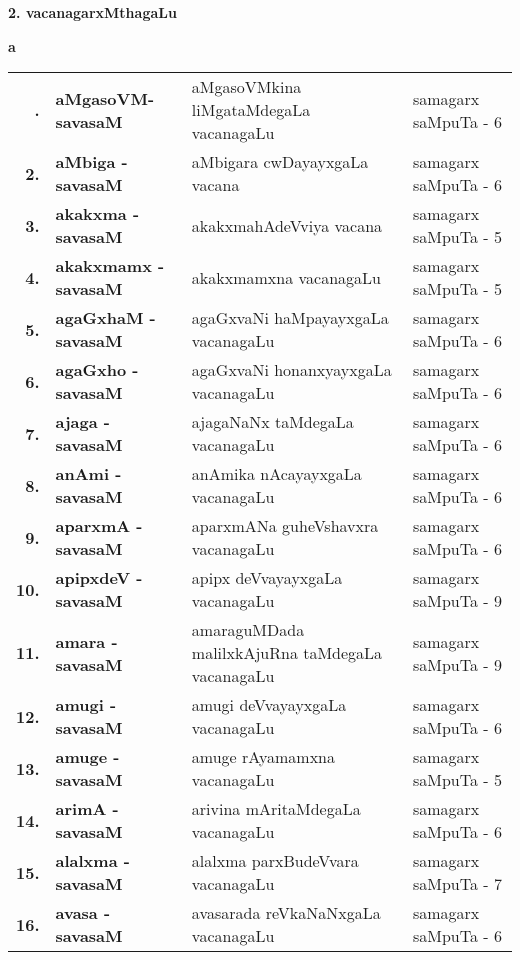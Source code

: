 \newpage

\begin{center}
{\large\bf 2. vacanagarxMthagaLu}
\end{center}

\medskip

\centerline{\bf a}

\medskip

{\renewcommand{\arraystretch}{1.35}
\begin{longtable}{>{\bf}r>{\bf}l>{\raggedright}p{8cm}l}
\endfirsthead
\endhead
\endfoot
\endlastfoot
1. & aMgasoVM-savasaM & aMgasoVMkina liMgataMdegaLa vacanagaLu & samagarx saMpuTa - 6\\
2. & aMbiga - savasaM & aMbigara cwDayayxgaLa vacana & samagarx saMpuTa - 6 \\
3. & akakxma - savasaM & akakxmahAdeVviya vacana & samagarx saMpuTa - 5 \\
4. & akakxmamx - savasaM & akakxmamxna vacanagaLu & samagarx saMpuTa - 5 \\
5. & agaGxhaM - savasaM & agaGxvaNi haMpayayxgaLa vacanagaLu & samagarx saMpuTa - 6 \\
6. & agaGxho - savasaM & agaGxvaNi honanxyayxgaLa vacanagaLu & samagarx saMpuTa - 6 \\
7. & ajaga - savasaM & ajagaNaNx taMdegaLa vacanagaLu & samagarx saMpuTa - 6 \\
8. & anAmi - savasaM & anAmika nAcayayxgaLa vacanagaLu & samagarx saMpuTa - 6 \\
9. & aparxmA - savasaM & aparxmANa guheVshavxra vacanagaLu & samagarx saMpuTa - 6 \\
10. & apipxdeV - savasaM & apipx deVvayayxgaLa vacanagaLu & samagarx saMpuTa - 9 \\
11. & amara - savasaM & amaraguMDada malilxkAjuRna taMdegaLa vacanagaLu & samagarx saMpuTa - 9 \\
12. & amugi - savasaM & amugi deVvayayxgaLa vacanagaLu & samagarx saMpuTa - 6 \\
13. & amuge - savasaM & amuge rAyamamxna vacanagaLu & samagarx saMpuTa - 5 \\
14. & arimA - savasaM & arivina mAritaMdegaLa vacanagaLu & samagarx saMpuTa - 6 \\
15. & alalxma - savasaM & alalxma parxBudeVvara vacanagaLu & samagarx saMpuTa - 7 \\
16. & avasa - savasaM &  avasarada reVkaNaNxgaLa vacanagaLu & samagarx saMpuTa - 6
\end{longtable}}
\bigskip

